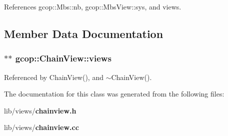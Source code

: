 \-References gcop\-::\-Mbs\-::nb, gcop\-::\-Mbs\-View\-::sys, and views.



\subsection{\-Member \-Data \-Documentation}
\subsubsection[{views}]{$\ast$$\ast$ {\bf gcop\-::\-Chain\-View\-::views}}\label{classgcop_1_1ChainView_abdc1a87d01451330fa4efa207b22ce0d}


\-Referenced by \-Chain\-View(), and $\sim$\-Chain\-View().



\-The documentation for this class was generated from the following files\-:\begin{DoxyCompactItemize}
\item 
lib/views/{\bf chainview.\-h}\item 
lib/views/{\bf chainview.\-cc}\end{DoxyCompactItemize}
